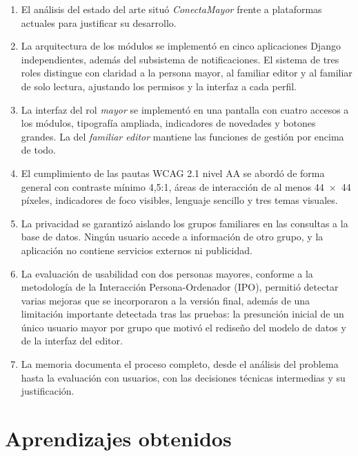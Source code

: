 \begin{enumerate}
  \item El análisis del estado del arte situó \emph{ConectaMayor} frente a plataformas actuales para justificar su desarrollo.

  \item La arquitectura de los módulos se implementó en cinco aplicaciones Django
  independientes, además del subsistema de notificaciones. El
  sistema de tres roles distingue con claridad a la persona mayor, al
  familiar editor y al familiar de solo lectura, ajustando los permisos y
  la interfaz a cada perfil.

  \item La interfaz del rol \emph{mayor} se implementó en una pantalla con
  cuatro accesos a los módulos, tipografía ampliada, indicadores de
  novedades y botones grandes. La del \emph{familiar editor} mantiene las
  funciones de gestión por encima de todo.

  \item El cumplimiento de las pautas WCAG 2.1 nivel AA se abordó de forma
  general con contraste mínimo 4{,}5:1, áreas de interacción de al
  menos 44~$\times$~44 píxeles, indicadores de foco visibles, lenguaje
  sencillo y tres temas visuales.

  \item La privacidad se garantizó aislando los grupos familiares en las
  consultas a la base de datos. Ningún usuario accede a información de otro
  grupo, y la aplicación no contiene servicios externos ni publicidad.

  \item La evaluación de usabilidad con dos personas mayores, conforme a la
  metodología de la Interacción Persona-Ordenador (IPO), permitió detectar
  varias mejoras que se incorporaron a la versión final, además de una
  limitación importante detectada tras las pruebas: la presunción inicial de un único
  usuario mayor por grupo que motivó el rediseño del modelo de datos y de la
  interfaz del editor.

  \item La memoria documenta el proceso completo, desde el análisis del
  problema hasta la evaluación con usuarios, con las decisiones técnicas
  intermedias y su justificación.
\end{enumerate}


\section{Aprendizajes obtenidos\label{SEC:CONC_APRENDIZAJES}}

